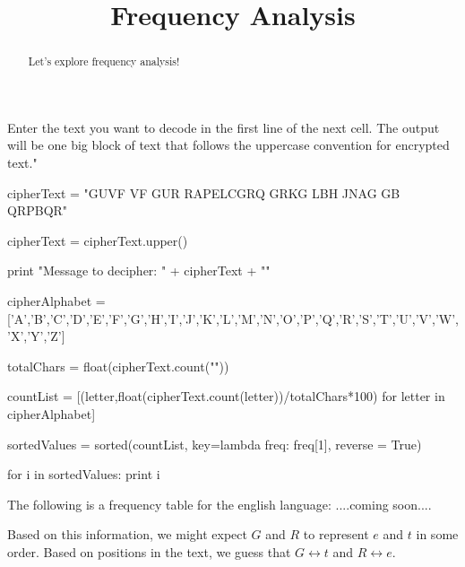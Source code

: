 \documentclass[handout]{ximera}
\title{Frequency Analysis}
\begin{document}
\begin{abstract}{Let's explore frequency analysis!}\end{abstract}


Enter the text you want to decode in the first line of the next cell.  The output will be one big block of text that follows the uppercase convention for encrypted text."

\begin{python}
cipherText = "GUVF VF GUR RAPELCGRQ GRKG LBH JNAG GB QRPBQR"

cipherText = cipherText.upper()

print "Message to decipher: " + cipherText + ""

cipherAlphabet = ['A','B','C','D','E','F','G','H','I','J','K','L','M','N','O','P','Q','R','S','T','U','V','W','X','Y','Z']

totalChars = float(cipherText.count(""))

countList = [(letter,float(cipherText.count(letter))/totalChars*100) for letter in cipherAlphabet]

sortedValues = sorted(countList, key=lambda freq: freq[1], reverse = True)

for i in sortedValues:
	print i
\end{python}

The following is a frequency table for the english language: ....coming soon....


Based on this information, we might expect $G$ and $R$ to represent $e$ and $t$ in some order.  Based on positions in the text, we guess that $G \leftrightarrow t$ and $R \leftrightarrow e$.
\end{document}
